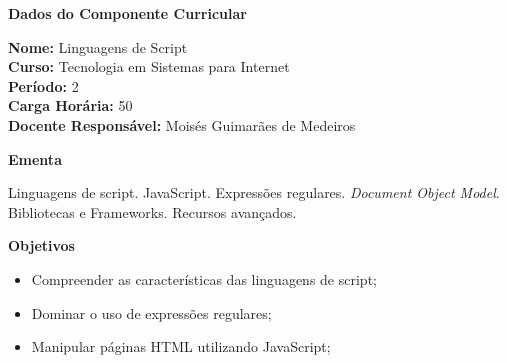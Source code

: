 

\begin{snugshade}\begin{center}\textbf{
    Dados do Componente Curricular
}\end{center}\end{snugshade}

\noindent \textbf{Nome:}                Linguagens de Script
\\        \textbf{Curso:}               Tecnologia em Sistemas para Internet
\\        \textbf{Período:}             \unit{2}{\degree}
\\        \textbf{Carga Horária:}       \unit{50}{\hour}
\\        \textbf{Docente Responsável:} Moisés Guimarães de Medeiros


\begin{snugshade}\begin{center}\textbf{
    Ementa
\vphantom{q}}\end{center}\end{snugshade}

\noindent
Linguagens de script. JavaScript. Expressões regulares. \textit{Document Object Model}. Bibliotecas e Frameworks. Recursos avançados.


\begin{snugshade}\begin{center}\textbf{
    Objetivos
}\end{center}\end{snugshade}

\begin{itemize}

\item Compreender as características das linguagens de script;

\item Dominar o uso de expressões regulares;

\item Manipular páginas HTML utilizando JavaScript;

\end{itemize}



